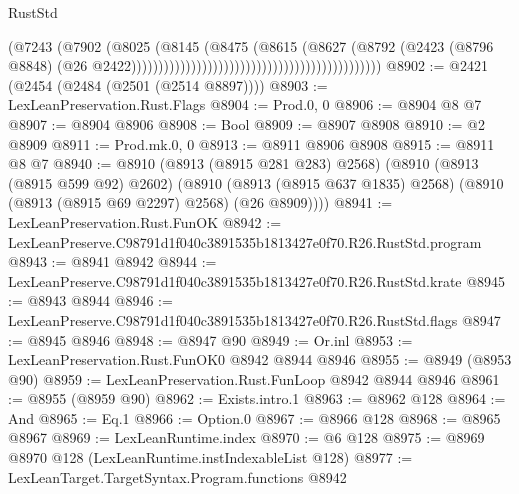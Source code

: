 \begin{lexlean}{RustStd}
\begin{coremodule}
                                                                            (@7243
                                                                              (@7902
                                                                                (@8025
                                                                                  (@8145
                                                                                    (@8475
                                                                                      (@8615
                                                                                        (@8627
                                                                                          (@8792
                                                                                            (@2423
                                                                                              (@8796
                                                                                                @8848)
                                                                                              (@26
                                                                                                @2422))))))))))))))))))))))))))))))))))))))))))))))
@8902 := @2421 (@2454 (@2484 (@2501 (@2514 @8897))))
@8903 := LexLeanPreservation.Rust.Flags
@8904 := Prod.{0, 0}
@8906 := @8904 @8 @7
@8907 := @8904 @8906
@8908 := Bool
@8909 := @8907 @8908
@8910 := @2 @8909
@8911 := Prod.mk.{0, 0}
@8913 := @8911 @8906 @8908
@8915 := @8911 @8 @7
@8940 := @8910
    (@8913 (@8915 @281 @283) @2568)
    (@8910
      (@8913 (@8915 @599 @92) @2602)
      (@8910 (@8913 (@8915 @637 @1835) @2568) (@8910 (@8913 (@8915 @69 @2297) @2568) (@26 @8909))))
@8941 := LexLeanPreservation.Rust.FunOK
@8942 := LexLeanPreserve.C98791d1f040c3891535b1813427e0f70.R26.RustStd.program
@8943 := @8941 @8942
@8944 := LexLeanPreserve.C98791d1f040c3891535b1813427e0f70.R26.RustStd.krate
@8945 := @8943 @8944
@8946 := LexLeanPreserve.C98791d1f040c3891535b1813427e0f70.R26.RustStd.flags
@8947 := @8945 @8946
@8948 := @8947 @90
@8949 := Or.inl
@8953 := LexLeanPreservation.Rust.FunOK0 @8942 @8944 @8946
@8955 := @8949 (@8953 @90)
@8959 := LexLeanPreservation.Rust.FunLoop @8942 @8944 @8946
@8961 := @8955 (@8959 @90)
@8962 := Exists.intro.{1}
@8963 := @8962 @128
@8964 := And
@8965 := Eq.{1}
@8966 := Option.{0}
@8967 := @8966 @128
@8968 := @8965 @8967
@8969 := LexLeanRuntime.index
@8970 := @6 @128
@8975 := @8969 @8970 @128 (LexLeanRuntime.instIndexableList @128)
@8977 := LexLeanTarget.TargetSyntax.Program.functions @8942

\end{coremodule}
\end{lexlean}
